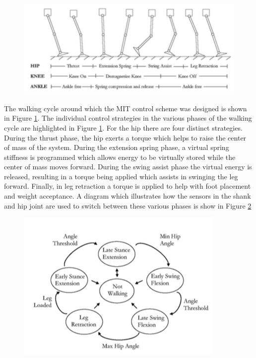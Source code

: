 \begin{figure}[thpb]
\centering
\includegraphics[width=4.in]{exos/figs/MIT/walkingCycle}
  \caption{}
  \vspace{-0.2in}
 \label{fig:walkingCycle} 
 \end{figure} 
The walking cycle around which the MIT control scheme was designed is shown in Figure \ref{fig:walkingCycle}.  The individual control strategies in the various phases of the walking cycle are highlighted in Figure \ref{fig:walkingCycle}.  For the hip there are four distinct strategies.  During the thrust phase, the hip exerts a torque which helps to raise the center of mass of the system.  During the extension spring phase, a virtual spring stiffness is programmed which allows energy to be virtually stored while the center of mass moves forward.  During the swing assist phase the virtual energy is released, resulting in a torque being applied which assists in swinging the leg forward.  Finally, in leg retraction a torque is applied to help with foot placement and weight acceptance.  A diagram which illustrates how the sensors in the shank and hip joint are used to switch between these various phases is show in Figure \ref{fig:hipControl} 
 \begin{figure}[thpb]
\centering
\includegraphics[width=3.in]{exos/figs/MIT/hipControl}
  \caption{}
  \vspace{-0.2in}
 \label{fig:hipControl} 
 \end{figure}  
 
